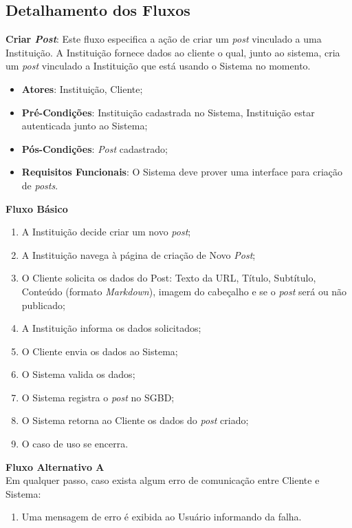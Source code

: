\subsection*{Detalhamento dos Fluxos}
\begin{lista}
  \item \textbf{Criar \emph{Post}}: Este fluxo especifica a ação de criar um \emph{post} vinculado a uma Instituição. A Instituição fornece dados ao cliente o qual, junto ao sistema, cria um \emph{post} vinculado a Instituição que está usando o Sistema no momento.
    \begin{itemize}
    \item \textbf{Atores}: Instituição, Cliente;
    \item \textbf{Pré-Condições}: Instituição cadastrada no Sistema, Instituição estar autenticada junto ao Sistema;
    \item \textbf{Pós-Condições}: \emph{Post} cadastrado;
    \item \textbf{Requisitos Funcionais}: O Sistema deve prover uma interface para criação de \emph{posts}.
    \end{itemize}
	
    \textbf{Fluxo Básico}
    \begin{enumerate}
    \item A Instituição decide criar um novo \emph{post};
    \item A Instituição navega à página de criação de Novo \emph{Post};
    \item O Cliente solicita os dados do Post: Texto da URL, Título, Subtítulo, Conteúdo (formato \emph{Markdown}), imagem do cabeçalho e se o \emph{post} será ou não publicado;
    \item A Instituição informa os dados solicitados;
    \item O Cliente envia os dados ao Sistema;
    \item O Sistema valida os dados;
    \item O Sistema registra o \emph{post} no SGBD;
    \item O Sistema retorna ao Cliente os dados do \emph{post} criado;
    \item O caso de uso se encerra.
    \end{enumerate}
    
    \textbf{Fluxo Alternativo A} \\
    Em qualquer passo, caso exista algum erro de comunicação entre Cliente e Sistema:
    \begin{enumerate}
    \item Uma mensagem de erro é exibida ao Usuário informando da falha.
    \end{enumerate}
    

\end{lista}
